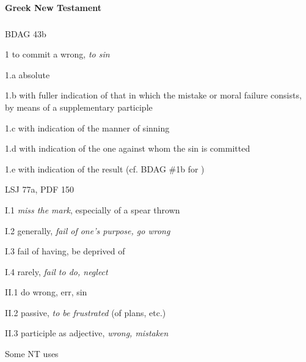 		\paragraph{Greek New Testament} %
			\label{SIN-GREEK}
			
			\subparagraph{\texorpdfstring{}{}}
				\label{HAMARTANO}
			
				\begin{compactdesc}
					\item[BDAG 43b] \textbf{}
						\begin{compactitem}
							\item[1] to commit a wrong, \textit{to sin}
							\item[1.a] absolute
							\item[1.b] with fuller indication of that in which the mistake or moral failure consists, by means of a supplementary participle
							\item[1.c] with indication of the manner of sinning
							\item[1.d] with indication of the one against whom the sin is committed
							\item[1.e] with indication of the result (cf. BDAG \#1b for )
						\end{compactitem}
					\item[LSJ 77a, PDF 150] \textbf{}
						\begin{compactitem}
							\item[I.1] \textit{miss the mark}, especially of a spear thrown
							\item[I.2] generally, \textit{fail of one's purpose, go wrong}
							\item[I.3] fail of having, be deprived of
							\item[I.4] rarely, \textit{fail to do, neglect}
							\item[II.1] do wrong, err, sin
							\item[II.2] passive, \textit{to be frustrated} (of plans, etc.)
							\item[II.3] participle as adjective, \textit{wrong, mistaken}
						\end{compactitem}
				\end{compactdesc}
				
				\begin{compactdesc}
					\item[Some NT uses] \textbf{}
						\begin{compactdesc}
							\item[]
						\end{compactdesc}
				\end{compactdesc}
		
